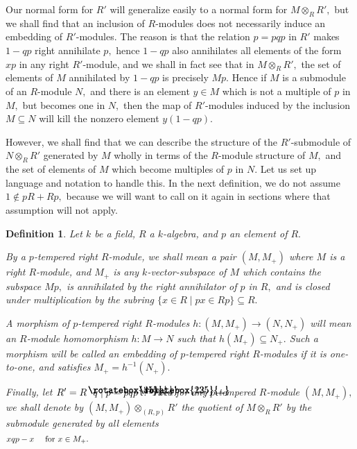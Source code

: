 \documentclass{amsart}
\newtheorem{definition}[theorem]{Definition}
\DeclareRobustCommand{\lang}{\begin{picture}(5,7)
\put(1.2,2.5){\rotatebox{45}{\line(1,0){6.0}}}
\put(1.2,2.5){\rotatebox{315}{\line(1,0){6.0}}}
\end{picture}\kern.16em}
\DeclareRobustCommand{\rang}{\kern.1em\begin{picture}(5,7)
\put(.1,2.5){\rotatebox{135}{\line(1,0){6.0}}}
\put(.1,2.5){\rotatebox{225}{\line(1,0){6.0}}}
\end{picture}}
\begin{document}
Our normal form for $R'$ will generalize easily
to a normal form for $M\otimes_R R',$
but we shall find that an inclusion
of $\!R\!$-modules does not necessarily induce an embedding
of $\!R'\!$-modules.
The reason is that the relation $p=pqp$ in $R'$ makes
$1-qp$ right annihilate $p,$ hence $1-qp$ also annihilates
all elements of the form $xp$ in any right $\!R'\!$-module, and
we shall in fact see that in $M\otimes_R R',$
the set of elements of $M$ annihilated by $1-qp$ is precisely $Mp.$
Hence if $M$ is a submodule of an $\!R\!$-module $N,$ and there is
an element $y\in M$ which is not a multiple of $p$ in $M,$
but becomes one in $N,$ then
the map of $\!R'\!$-modules induced by the inclusion
$M\subseteq N$ will kill the nonzero element $y(1-qp).$

However, we shall find that we can describe the structure
of the $\!R'\!$-submodule of $N\otimes_R R'$ generated by $M$ wholly
in terms of the $\!R\!$-module structure of $M,$ and the set of
elements of $M$ which become multiples of $p$ in $N.$
Let us set up language and notation to handle this.
In the next definition, we do not assume $1\notin pR+Rp,$
because we will want to call on it again in sections where that
assumption will not apply.

\begin{definition}\label{D.tempered}
Let $k$ be a field, $R$ a $\!k\!$-algebra, and $p$ an element of $R.$

By a {\em $\!p\!$-tempered} right $\!R\!$-module, we shall mean
a pair $(M,M_+)$ where $M$ is a right $\!R\!$-module, and
$M_+$ is any $\!k\!$-vector-subspace of $M$ which contains the
subspace $Mp,$ is annihilated by the right annihilator of $p$
in $R,$ and is closed under multiplication by the subring
$\{x\in R\mid px\in Rp\}\subseteq R.$

A {\em morphism} of $\!p\!$-tempered right $\!R\!$-modules
$h:(M,M_+)\to (N,N_+)$ will mean an
$\!R\!$-module homomorphism $h:M\to N$
such that $h(M_+)\subseteq N_+.$
Such a morphism will be called
an {\em embedding} of $\!p\!$-tempered right $\!R\!$-modules if it is
one-to-one, and satisfies $M_+=h^{-1}(N_+).$

Finally, let $R'=R\lang q\mid p=pqp\rang.$
Then for any $\!p\!$-tempered $\!R\!$-module $(M,M_+),$
we shall denote by $(M,M_+)\otimes_{(R,p)} R'$ the
quotient of $M\otimes_R R'$ by the submodule generated by all elements
\begin{equation}\begin{minipage}[c]{35pc}\label{d.M:xqp-x}
$xqp-x$ \quad for $x\in M_+.$
\end{minipage}\end{equation}
\end{definition}
\end{document}
